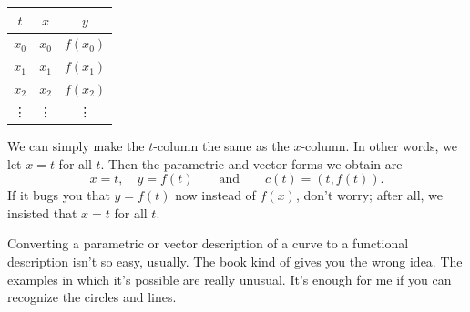 \documentclass[justified]{tufte-handout}
\begin{document}
\begin{center}
\begin{tabular}{c||c|c}
	$t$ & $x$  & $y$ \\ \hline
	$x_0$ & $x_0$ & $f(x_0)$ \\
	$x_1$ & $x_1$ & $f(x_1)$ \\
	$x_2$ & $x_2$ & $f(x_2)$ \\
	\vdots & \vdots & \vdots
\end{tabular}
\end{center}

We can simply make the $t$-column the same as the $x$-column. In other words, we let $x = t$ for all $t$. Then the parametric and vector forms we obtain are
\[
	x = t, \quad y = f(t) \qquad \text{and} \qquad c(t) = (t, f(t)).
\]
If it bugs you that $y = f(t)$ now instead of $f(x)$, don't worry; after all, we insisted that $x = t$ for all $t$.

Converting a parametric or vector description of a curve to a functional description isn't so easy, usually. The book kind of gives you the wrong idea. The examples in which it's possible are really unusual. It's enough for me if you can recognize the circles and lines. 
\end{document}
